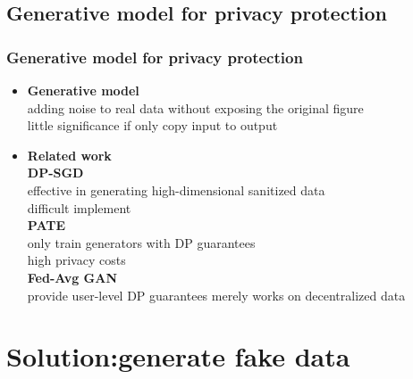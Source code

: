 \documentclass{beamer}
\begin{document}
\subsection{Generative model for privacy protection}
\begin{frame}
    \frametitle{Generative model for privacy protection}
    \begin{itemize}
        \item \textbf{Generative model}\\[5pt]
        adding noise to real data without exposing the original figure\\
        little significance if only copy input to output\\[10pt]
        \item \textbf{Related work}\\[5pt]
        \textbf{DP-SGD}\cite{ref2}\\
        effective in generating high-dimensional sanitized data\\
        difficult implement\\
        \textbf{PATE}\\
        only train generators with DP guarantees\\
        high privacy costs\\
        \textbf{Fed-Avg GAN}\\
        provide user-level DP guarantees
        merely works on decentralized data
    \end{itemize}
\end{frame}

\section{Solution:generate fake data}
\end{document}

